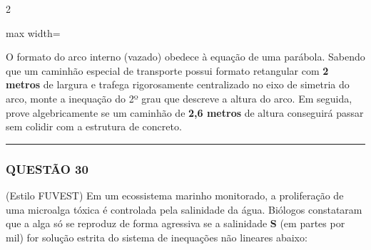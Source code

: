 \documentclass[twoside, 10pt, a4paper]{article}
\begin{document}
\begin{multicols*}{2}
\begin{center}
\begin{adjustbox}{max width=\linewidth}
\end{adjustbox}
\end{center}

O formato do arco interno (vazado) obedece à equação de uma parábola. Sabendo que um caminhão especial de transporte possui formato retangular com \textbf{2 metros} de largura e trafega rigorosamente centralizado no eixo de simetria do arco, monte a inequação do 2º grau que descreve a altura do arco. Em seguida, prove algebricamente se um caminhão de \textbf{2,6 metros} de altura conseguirá passar sem colidir com a estrutura de concreto.

\vspace{0cm} \noindent\textcolor{CorLinha}{\rule{\linewidth}{0.5pt}} \vspace{-0.2cm}
\subsubsection*{QUESTÃO 30}
(Estilo FUVEST) Em um ecossistema marinho monitorado, a proliferação de uma microalga tóxica é controlada pela salinidade da água. Biólogos constataram que a alga só se reproduz de forma agressiva se a salinidade \textbf{S} (em partes por mil) for solução estrita do sistema de inequações não lineares abaixo:


\end{multicols*}
\end{document}
